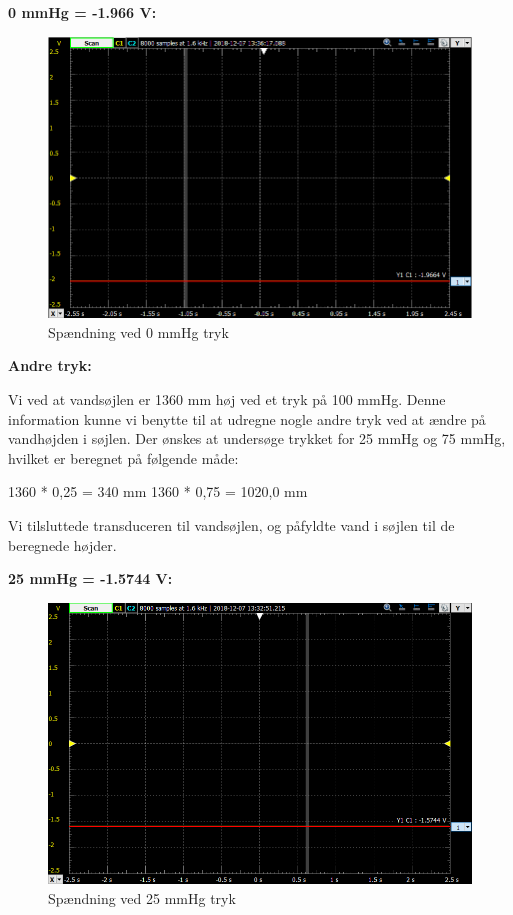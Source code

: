 \vspace{0.2 cm}

\textbf{0 mmHg  =  -1.966 V:}

\vspace{0.2 cm}


\begin{figure}[h!]
	\centering
	\includegraphics[width=1\linewidth]{Hardwaredesign/mmHg0}
	\caption{Spændning ved 0 mmHg tryk}
	\label{fig:0mmHg}
\end{figure}

\vspace{0.2 cm}

\textbf{Andre tryk:}

\vspace{0.2 cm}

Vi ved at vandsøjlen er 1360 mm høj ved et tryk på 100 mmHg. Denne information kunne vi benytte til at udregne nogle andre tryk ved at ændre på vandhøjden i søjlen.
Der ønskes at undersøge trykket for 25 mmHg og 75 mmHg, hvilket er beregnet på følgende måde:

1360 * 0,25 = 340 mm
1360 * 0,75 = 1020,0 mm

Vi tilsluttede transduceren til vandsøjlen, og påfyldte vand i søjlen til de beregnede højder.
\newpage

\textbf{25 mmHg  =  -1.5744 V:}

\begin{figure}[h!]
	\centering
	\includegraphics[width=1\linewidth]{Hardwaredesign/mmHg25}
	\caption{Spændning ved 25 mmHg tryk}
	\label{fig:mmHg25}
\end{figure}

